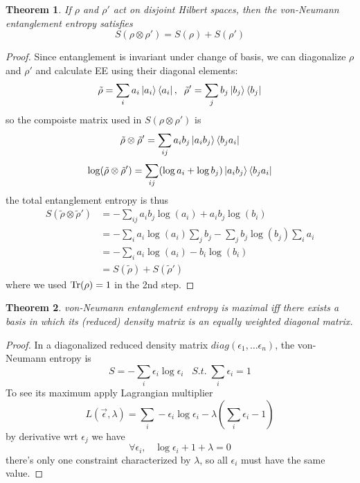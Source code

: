 \documentclass[11pt]{article}
\newtheorem{thm}{Theorem}
\theoremstyle{remark}
\theoremstyle{definition}
\begin{document}
\begin{thm} \label{thm5}
	If $\rho$ and $\rho'$ act on disjoint Hilbert spaces, then the von-Neumann entanglement entropy satisfies
	 \[
		 S(\rho \otimes \rho') = S(\rho) + S(\rho')
	\] 
\end{thm}
\begin{proof}
	 Since entanglement is invariant under change of basis, we can diagonalize $\rho$ and $\rho'$ and calculate EE using their diagonal elements:
	  \[
		  \tilde{\rho} = \sum_{i} a_i \ket{a_i}\bra{a_i},\;\; \tilde{\rho}' = \sum_{j} b_j \ket{b_j} \bra{b_j} 
	 \] 
	 so the compoiste matrix used in $S(\rho \otimes \rho')$ is
	  \[
		  \tilde{\rho} \otimes \tilde{\rho}' = \sum_{ij} a_i b_j \ket{a_i b_j}\bra{b_j a_i} 
	 \]
	 \[
		 \log(\tilde{\rho}\otimes \tilde{\rho}') = \sum_{ij}(\log a_i + \log b_j) \ket{a_i b_j}\bra{b_j a_i} 
	 \] 
	the total entanglement entropy is thus
	 \[
	 \begin{split}	
		 S(\tilde{\rho}\otimes \tilde{\rho}') &= - \sum_{ij} a_i b_j \log(a_i) + a_i b_j \log(b_i) \\
						      &= -\sum_{i}a_i \log(a_i) \sum_{j}b_j - \sum_{j}b_j \log(b_j) \sum_{i}a_i\\
						      &= -\sum_{i}a_i\log(a_i) - b_i \log(b_i)\\
						      &= S(\tilde{\rho}) + S(\tilde{\rho}')
	 \end{split}
	 \] 
	 where we used $\Tr(\rho) = 1$ in the 2nd step. 
\end{proof}





\begin{thm}
	von-Neumann entanglement entropy is maximal iff there exists a basis in which its (reduced) density matrix is an equally weighted diagonal matrix. 
\end{thm}
\begin{proof}
	In a diagonalized reduced density matrix $diag(\epsilon_1, \ldots \epsilon_n)$, the von-Neumann entropy is
	\[
	S = -\sum_{i} \epsilon_i \log \epsilon_i\;\;\;S.t.\; \sum_{i}\epsilon_i = 1 
	\] 
To see its maximum apply Lagrangian multiplier
\[
	L(\vec{\epsilon},\lambda) = \sum_{i} -\epsilon_i \log \epsilon_i - \lambda \left( \sum_{i} \epsilon_i - 1 \right) 
\] 
by derivative wrt $\epsilon_j$ we have
\[
\forall \epsilon_i,\;\;\;\log \epsilon_i + 1 + \lambda = 0
\] 
there's only one constraint characterized by $\lambda$, so all $\epsilon_i$ must have the same value.
\end{proof}
\end{document}
